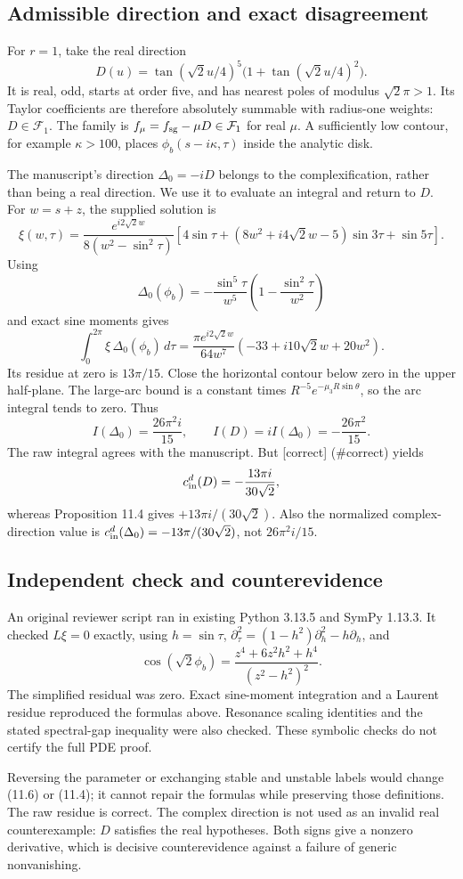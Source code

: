 \documentclass[10pt]{article}
\begin{document}
\subsection*{Admissible direction and exact disagreement}
For \(r=1\), take the real direction \[D(u)=\tan(\sqrt2u/4)^5\bigl(1+\tan(\sqrt2u/4)^2\bigr).\] It is real, odd, starts at order five, and has nearest poles of modulus \(\sqrt2\pi>1\). Its Taylor coefficients are therefore absolutely summable with radius-one weights: \(D\in\mathcal F_1\). The family is \(f_\mu=f_{\rm sg}-\mu D\in\mathcal F_1\) for real \(\mu\). A sufficiently low contour, for example \(\kappa>100\), places \(\phi_b(s-i\kappa,\tau)\) inside the analytic disk.\par
The manuscript’s direction \(\Delta_0=-iD\) belongs to the complexification, rather than being a real direction. We use it to evaluate an integral and return to \(D\). For \(w=s+z\), the supplied solution is \[\xi(w,\tau)=\frac{e^{i2\sqrt2w}}{8(w^2-\sin^2\tau)}
\left[4\sin\tau+(8w^2+i4\sqrt2w-5)\sin3\tau+\sin5\tau\right].\] Using \[\Delta_0(\phi_b)=-\frac{\sin^5\tau}{w^5}
 \left(1-\frac{\sin^2\tau}{w^2}\right)\] and exact sine moments gives \[\int_0^{2\pi}\xi\,\Delta_0(\phi_b)\,d\tau
=\frac{\pi e^{i2\sqrt2w}}{64w^7}(-33+i10\sqrt2w+20w^2).\] Its residue at zero is \(13\pi/15\). Close the horizontal contour below zero in the upper half-plane. The large-arc bound is a constant times \(R^{-5}e^{-\mu_3R\sin\theta}\), so the arc integral tends to zero. Thus \[I(\Delta_0)=\frac{26\pi^2i}{15},\qquad
I(D)=iI(\Delta_0)=-\frac{26\pi^2}{15}.\] The raw integral agrees with the manuscript. But [correct] (\#correct) yields \[c_{\rm in}^{d}(D)=-\frac{13\pi i}{30\sqrt2},\] whereas Proposition 11.4 gives \(+13\pi i/(30\sqrt2)\). Also the normalized complex-direction value is \(c_{\rm in}^{d}(\Delta_0)=-13\pi/(30\sqrt2)\), not \(26\pi^2i/15\).\par
\subsection*{Independent check and counterevidence}
An original reviewer script ran in existing Python 3.13.5 and SymPy 1.13.3. It checked \(L\xi=0\) exactly, using \(h=\sin\tau\), \(\partial_\tau^2=(1-h^2)\partial_h^2-h\partial_h\), and \[\cos(\sqrt2\phi_b)=
\frac{z^4+6z^2h^2+h^4}{(z^2-h^2)^2}.\] The simplified residual was zero. Exact sine-moment integration and a Laurent residue reproduced the formulas above. Resonance scaling identities and the stated spectral-gap inequality were also checked. These symbolic checks do not certify the full PDE proof.\par
Reversing the parameter or exchanging stable and unstable labels would change (11.6) or (11.4); it cannot repair the formulas while preserving those definitions. The raw residue is correct. The complex direction is not used as an invalid real counterexample: \(D\) satisfies the real hypotheses. Both signs give a nonzero derivative, which is decisive counterevidence against a failure of generic nonvanishing.\par
\end{document}
